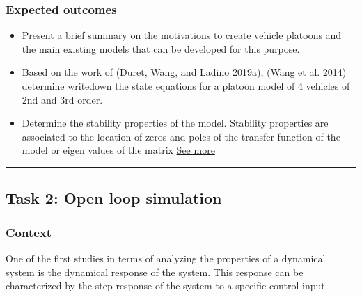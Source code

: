 \documentclass[]{book}
\providecommand{\tightlist}{%
  \setlength{\itemsep}{0pt}\setlength{\parskip}{0pt}}
\theoremstyle{definition}
\theoremstyle{definition}
\theoremstyle{definition}
\theoremstyle{remark}
\begin{document}
\hypertarget{expected-outcomes-4}{%
\subsubsection*{Expected outcomes}\label{expected-outcomes-4}}

\begin{itemize}
\tightlist
\item
  Present a brief summary on the motivations to create vehicle platoons
  and the main existing models that can be developed for this purpose.
\item
  Based on the work of (Duret, Wang, and Ladino
  \protect\hyperlink{ref-Duret2019:ISTTT}{2019}\protect\hyperlink{ref-Duret2019:ISTTT}{a}),
  (Wang et al. \protect\hyperlink{ref-Meng2014b:TR-C}{2014}) determine
  writedown the state equations for a platoon model of 4 vehicles of 2nd
  and 3rd order.\\
\item
  Determine the stability properties of the model. Stability properties
  are associated to the location of zeros and poles of the transfer
  function of the model or eigen values of the matrix
  \href{https://en.wikipedia.org/wiki/Stability_theory}{See more}
\end{itemize}

\begin{center}\rule{0.5\linewidth}{\linethickness}\end{center}

\hypertarget{task-2-open-loop-simulation}{%
\subsection*{Task 2: Open loop
simulation}\label{task-2-open-loop-simulation}}

\hypertarget{context-6}{%
\subsubsection*{Context}\label{context-6}}

One of the first studies in terms of analyzing the properties of a
dynamical system is the dynamical response of the system. This response
can be characterized by the step response of the system to a specific
control input.
\end{document}
